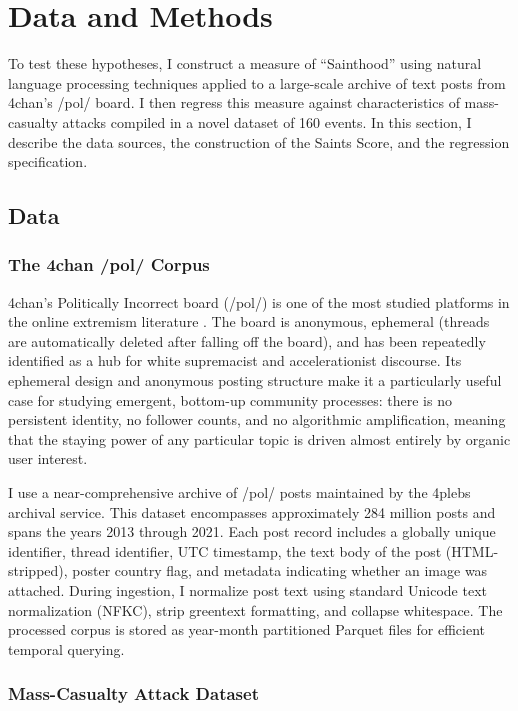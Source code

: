\documentclass[12pt]{article}
\begin{document}
\section{Data and Methods}

To test these hypotheses, I construct a measure of ``Sainthood'' using natural language processing techniques applied to a large-scale archive of text posts from 4chan's /pol/ board. I then regress this measure against characteristics of mass-casualty attacks compiled in a novel dataset of 160 events. In this section, I describe the data sources, the construction of the Saints Score, and the regression specification.

\subsection{Data}

\subsubsection{The 4chan /pol/ Corpus}

4chan's Politically Incorrect board (/pol/) is one of the most studied platforms in the online extremism literature \parencite{hine2017kek, papasavva2020raiders}. The board is anonymous, ephemeral (threads are automatically deleted after falling off the board), and has been repeatedly identified as a hub for white supremacist and accelerationist discourse. Its ephemeral design and anonymous posting structure make it a particularly useful case for studying emergent, bottom-up community processes: there is no persistent identity, no follower counts, and no algorithmic amplification, meaning that the staying power of any particular topic is driven almost entirely by organic user interest.

I use a near-comprehensive archive of /pol/ posts maintained by the 4plebs archival service. This dataset encompasses approximately 284 million posts and spans the years 2013 through 2021. Each post record includes a globally unique identifier, thread identifier, UTC timestamp, the text body of the post (HTML-stripped), poster country flag, and metadata indicating whether an image was attached. During ingestion, I normalize post text using standard Unicode text normalization (NFKC), strip greentext formatting, and collapse whitespace. The processed corpus is stored as year-month partitioned Parquet files for efficient temporal querying.

\subsubsection{Mass-Casualty Attack Dataset}
\end{document}
